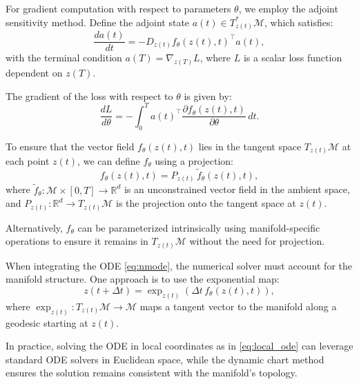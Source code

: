 \documentclass[a4paper,14pt]{article}
\theoremstyle{plain} %
\theoremstyle{definition} %
\theoremstyle{remark} %
\begin{document}
	For gradient computation with respect to parameters $\theta$, we employ the adjoint sensitivity method. Define the adjoint state $a(t) \in T_{z(t)}^*\mathcal{M}$, which satisfies:
	\begin{equation}
		\frac{da(t)}{dt} = - D_{z(t)} f_\theta(z(t), t)^\top a(t),
		\label{eq:adjoint}
	\end{equation}
	with the terminal condition $a(T) = \nabla_{z(T)} L$, where $L$ is a scalar loss function dependent on $z(T)$.
	
	The gradient of the loss with respect to $\theta$ is given by:
	\begin{equation}
		\frac{dL}{d\theta} = - \int_0^T a(t)^\top \frac{\partial f_\theta(z(t), t)}{\partial \theta} \, dt.
		\label{eq:gradient_theta}
	\end{equation}
	
	To ensure that the vector field $f_\theta(z(t), t)$ lies in the tangent space $T_{z(t)}\mathcal{M}$ at each point $z(t)$, we can define $f_\theta$ using a projection:
	\begin{equation}
		f_\theta(z(t), t) = P_{z(t)} \, \tilde{f}_\theta(z(t), t),
		\label{eq:vector_field_projection}
	\end{equation}
	where $\tilde{f}_\theta: \mathcal{M} \times [0, T] \rightarrow \mathbb{R}^d$ is an unconstrained vector field in the ambient space, and $P_{z(t)}: \mathbb{R}^d \rightarrow T_{z(t)}\mathcal{M}$ is the projection onto the tangent space at $z(t)$.
	
	Alternatively, $f_\theta$ can be parameterized intrinsically using manifold-specific operations to ensure it remains in $T_{z(t)}\mathcal{M}$ without the need for projection.
	
	When integrating the ODE \eqref{eq:nmode}, the numerical solver must account for the manifold structure. One approach is to use the exponential map:
	\begin{equation}
		z(t + \Delta t) = \exp_{z(t)} \left( \Delta t \, f_\theta(z(t), t) \right),
		\label{eq:exponential_map_update}
	\end{equation}
	where $\exp_{z(t)}: T_{z(t)}\mathcal{M} \rightarrow \mathcal{M}$ maps a tangent vector to the manifold along a geodesic starting at $z(t)$.
	
	In practice, solving the ODE in local coordinates as in \eqref{eq:local_ode} can leverage standard ODE solvers in Euclidean space, while the dynamic chart method ensures the solution remains consistent with the manifold's topology.
	
\end{document}

